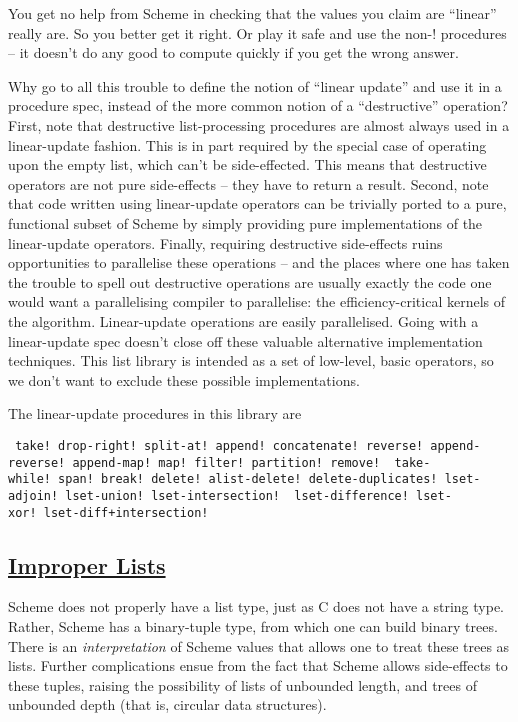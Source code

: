 You get no help from Scheme in checking that the values you claim are
``linear'' really are. So you better get it right. Or play it safe and
use the non-! procedures -- it doesn't do any good to compute quickly if
you get the wrong answer.

Why go to all this trouble to define the notion of ``linear update'' and
use it in a procedure spec, instead of the more common notion of a
``destructive'' operation? First, note that destructive list-processing
procedures are almost always used in a linear-update fashion. This is in
part required by the special case of operating upon the empty list,
which can't be side-effected. This means that destructive operators are
not pure side-effects -- they have to return a result. Second, note that
code written using linear-update operators can be trivially ported to a
pure, functional subset of Scheme by simply providing pure
implementations of the linear-update operators. Finally, requiring
destructive side-effects ruins opportunities to parallelise these
operations -- and the places where one has taken the trouble to spell
out destructive operations are usually exactly the code one would want a
parallelising compiler to parallelise: the efficiency-critical kernels
of the algorithm. Linear-update operations are easily parallelised.
Going with a linear-update spec doesn't close off these valuable
alternative implementation techniques. This list library is intended as
a set of low-level, basic operators, so we don't want to exclude these
possible implementations.

The linear-update procedures in this library are

\texttt{\ take!\ drop-right!\ split-at!\ append!\ concatenate!\ reverse!\ append-reverse!\ append-map!\ map!\ filter!\ partition!\ remove!\ \ take-while!\ span!\ break!\ delete!\ alist-delete!\ delete-duplicates!\ lset-adjoin!\ lset-union!\ lset-intersection!\ \ lset-difference!\ lset-xor!\ lset-diff+intersection!}

\subsection{\texorpdfstring{\href{}{Improper
Lists}}{Improper Lists}}\label{improper-lists}

Scheme does not properly have a list type, just as C does not have a
string type. Rather, Scheme has a binary-tuple type, from which one can
build binary trees. There is an \emph{interpretation} of Scheme values
that allows one to treat these trees as lists. Further complications
ensue from the fact that Scheme allows side-effects to these tuples,
raising the possibility of lists of unbounded length, and trees of
unbounded depth (that is, circular data structures).

